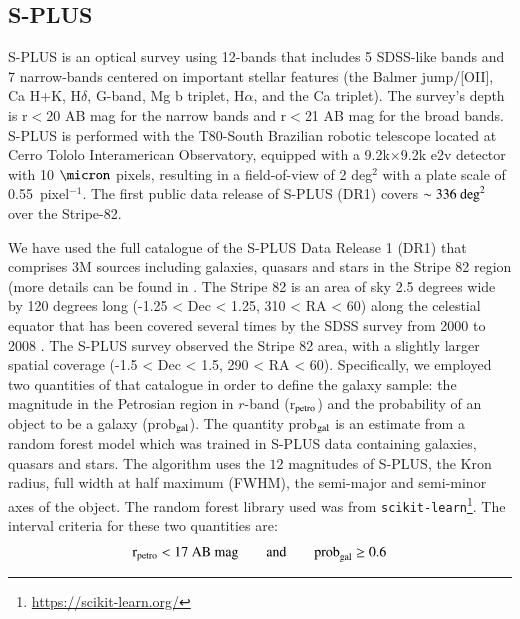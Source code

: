 \documentclass[fleqn,usenatbib]{mnras}
\begin{document}
\subsection{S-PLUS}


S-PLUS is an optical survey using 12-bands \citep[the so-called Javalambre magnitude system, described in ][]{JPLUS} that includes 5 SDSS-like bands and 7 narrow-bands centered on important stellar features (the Balmer jump/[OII], Ca H+K, H$\delta$, G-band, Mg b triplet, H$\alpha$, and the Ca triplet). The survey's depth is r$<$20 AB mag for the narrow bands and r$<$21 AB mag for the broad bands. S-PLUS is performed with the T80-South Brazilian robotic telescope located at Cerro Tololo Interamerican Observatory, equipped with a 9.2k$\times$9.2k e2v detector with 10 $\micron$ pixels, resulting in a field-of-view of 2 deg$^2$ with a plate scale of 0.55\arcsec\ pixel$^{-1}$. The first public data release of S-PLUS (DR1) covers $\sim 336{\rm \ deg}^2$ over the Stripe-82.  



We have used the full catalogue of the S-PLUS Data Release 1 (DR1) that comprises 3M sources including galaxies, quasars and stars in the Stripe 82 region (more details can be found in \citet{nakazono2021discovery}. The Stripe 82 is an area of sky 2.5  degrees wide by 120 degrees long (-1.25 < Dec < 1.25, 310 < RA < 60) along the celestial equator that has been covered several times by the SDSS survey from 2000 to 2008 \citep{Abazajian_2009}. The S-PLUS survey observed the Stripe 82 area, with a slightly larger spatial coverage (-1.5 < Dec < 1.5, 290 < RA < 60). Specifically, we employed two quantities of that catalogue in order to define the galaxy sample: the magnitude in the Petrosian region in $r$-band (r$_{\rm petro}$) and the probability of an object to be a galaxy (prob$_{\rm gal}$). 
The quantity prob$_{\rm gal}$ is an estimate from a random forest model which was trained in S-PLUS data containing galaxies, quasars and stars. The algorithm uses the $12$ magnitudes of S-PLUS, the Kron radius, full width at half maximum (FWHM), the semi-major and semi-minor axes of the object. The random forest library used was from \texttt{scikit-learn}\footnote{\url{https://scikit-learn.org/}}. 
The interval criteria for these two quantities are:
\begin{align}
    {\rm r}_{\rm petro} < 17 ~{\rm AB~mag}
    \qquad \text{and} \qquad  
    {\rm prob}_{\rm gal} \geq 0.6
    \nonumber
\end{align}
\end{document}
